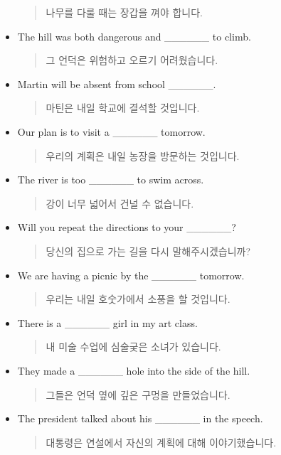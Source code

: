 \documentclass{article}
\begin{document}
\begin{addmargin}[1em]{1em}
\begin{itemize}
    \begin{quote}
    나무를 다룰 때는 장갑을 껴야 합니다.
    \end{quote}
    \item The hill was both dangerous and \_\_\_\_\_\_ to climb.
    \begin{quote}
    그 언덕은 위험하고 오르기 어려웠습니다.
    \end{quote}
    \item Martin will be absent from school \_\_\_\_\_\_.
    \begin{quote}
    마틴은 내일 학교에 결석할 것입니다.
    \end{quote}
    \item Our plan is to visit a \_\_\_\_\_\_ tomorrow.
    \begin{quote}
    우리의 계획은 내일 농장을 방문하는 것입니다.
    \end{quote}
    \item The river is too \_\_\_\_\_\_ to swim across.
    \begin{quote}
    강이 너무 넓어서 건널 수 없습니다.
    \end{quote}
    \item Will you repeat the directions to your \_\_\_\_\_\_?
    \begin{quote}
    당신의 집으로 가는 길을 다시 말해주시겠습니까?
    \end{quote}
    \item We are having a picnic by the \_\_\_\_\_\_ tomorrow.
    \begin{quote}
    우리는 내일 호숫가에서 소풍을 할 것입니다.
    \end{quote}
    \item There is a \_\_\_\_\_\_ girl in my art class.
    \begin{quote}
    내 미술 수업에 심술궂은 소녀가 있습니다.
    \end{quote}
    \item They made a \_\_\_\_\_\_ hole into the side of the hill.
    \begin{quote}
    그들은 언덕 옆에 깊은 구멍을 만들었습니다.
    \end{quote}
    \item The president talked about his \_\_\_\_\_\_ in the speech.
    \begin{quote}
    대통령은 연설에서 자신의 계획에 대해 이야기했습니다.
    \end{quote}
\end{itemize}
\end{addmargin}
\end{document}
